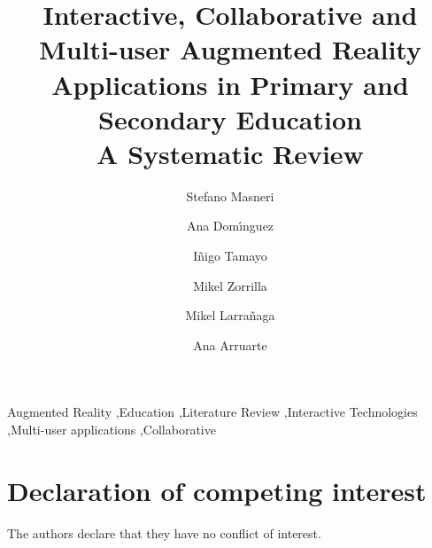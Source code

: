 \documentclass[review]{elsarticle}
\begin{document}
\begin{frontmatter}

\title{Interactive, Collaborative and Multi-user Augmented Reality Applications in Primary and Secondary Education\\A Systematic Review}

\author[afdfb752f06ee,ac6dea591aa79]{Stefano Masneri}
\author[afdfb752f06ee]{Ana Dom\'{\i}nguez}
\author[afdfb752f06ee]{I{\~{n}}igo Tamayo}
\author[afdfb752f06ee]{Mikel Zorrilla}
\author[ac6dea591aa79]{Mikel Larra{\~{n}}aga}
\author[ac6dea591aa79]{Ana Arruarte}
    
\address[afdfb752f06ee]{Digital Media\unskip, 
    Vicomtech\unskip, San Sebasti\'{a}n\unskip, Spain}
  	
\address[ac6dea591aa79]{Computer Languages and Systems\unskip, 
    University of the Basque Country (UPV/EHU)\unskip, San Sebasti\'{a}n\unskip, Spain}



\begin{keyword}
Augmented Reality \sep Education \sep Literature Review \sep Interactive Technologies \sep Multi-user applications \sep Collaborative
\end{keyword}

\end{frontmatter}

\linenumbers

%

%






%

\section*{Declaration of competing interest}
The authors declare that they have no conflict of interest.

%
 
\end{document}
